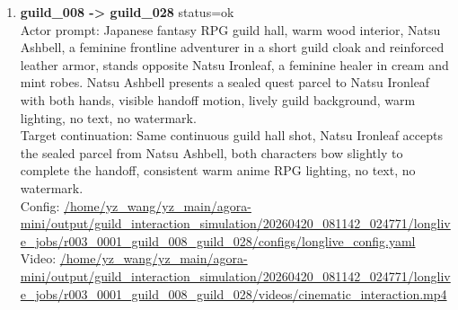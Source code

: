 \documentclass[11pt,a4paper]{article}
\begin{document}
\begin{enumerate}
\item \textbf{guild\_008 -> guild\_028} status=ok\\\newline Actor prompt: Japanese fantasy RPG guild hall, warm wood interior, Natsu Ashbell, a feminine frontline adventurer in a short guild cloak and reinforced leather armor, stands opposite Natsu Ironleaf, a feminine healer in cream and mint robes. Natsu Ashbell presents a sealed quest parcel to Natsu Ironleaf with both hands, visible handoff motion, lively guild background, warm lighting, no text, no watermark.\\\newline Target continuation: Same continuous guild hall shot, Natsu Ironleaf accepts the sealed parcel from Natsu Ashbell, both characters bow slightly to complete the handoff, consistent warm anime RPG lighting, no text, no watermark.\\\newline Config: \url{/home/yz\_wang/yz\_main/agora-mini/output/guild\_interaction\_simulation/20260420\_081142\_024771/longlive\_jobs/r003\_0001\_guild\_008\_guild\_028/configs/longlive\_config.yaml}\\\newline Video: \url{/home/yz\_wang/yz\_main/agora-mini/output/guild\_interaction\_simulation/20260420\_081142\_024771/longlive\_jobs/r003\_0001\_guild\_008\_guild\_028/videos/cinematic\_interaction.mp4}
\end{enumerate}
\end{document}
